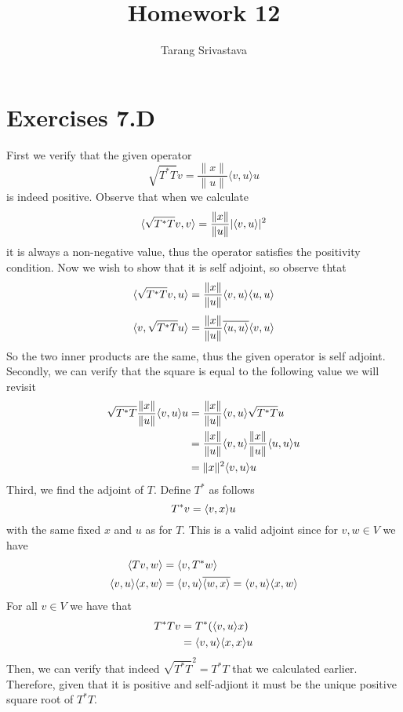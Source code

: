 \documentclass[10pt, twocolumn]{article}
\title{Homework 12}
\author{Tarang Srivastava}
\begin{document}
\makechaptertitle

\section{Exercises 7.D}
\begin{q}[1]
    First we verify that the given operator
    $$ \sqrt{T^{*} T} v=\frac{\|x\|}{\|u\|}\langle v, u\rangle u $$
    is indeed positive. 
    Observe that when we calculate 
    $$ \langle \sqrt{T^{*} T} v, v\rangle = \frac{\|x\|}{\|u\|}|\langle v, u\rangle|^2 $$
    it is always a non-negative value, thus the operator satisfies the positivity condition.
    Now we wish to show that it is self adjoint, so observe thtat 
    $$  \langle \sqrt{T^* T}v, u\rangle = \frac{\|x\|}{\|u\|}\langle v, u\rangle \langle u, u\rangle $$
    $$  \langle v, \sqrt{T^* T}u\rangle = \frac{\|x\|}{\|u\|} \overline{\langle u, u\rangle} \langle v, u\rangle $$
    So the two inner products are the same, thus the given operator is self adjoint.
    Secondly, we can verify that the square is equal to the following value we will revisit
    \begin{align*}
        \sqrt{T^{*} T} \frac{\|x\|}{\|u\|}\langle v, u\rangle u &= \frac{\|x\|}{\|u\|}\langle v, u\rangle \sqrt{T^{*} T} u \\
        &= \frac{\|x\|}{\|u\|}\langle v, u\rangle \frac{\|x\|}{\|u\|}\langle u, u\rangle u \\
        &= \|x\|^2 \langle v, u\rangle u
    \end{align*}
    Third, we find the adjoint of $ T $. 
    Define $ T^* $ as follows
    $$ T^*v = \langle v, x\rangle u $$
    with the same fixed $ x $ and $ u $ as for $ T $.
    This is a valid adjoint since for $ v, w \in V $ we have
    \begin{align*}
        \langle Tv, w\rangle &= \langle v, T^*w\rangle \\
        \langle v, u\rangle\langle x, w\rangle &= \langle v, u\rangle\overline{\langle w, x\rangle} = \langle v, u\rangle\langle x, w\rangle
    \end{align*}
    For all $ v \in V $ we have that 
    \begin{align*}
        T^* T v &= T^*(\langle v, u\rangle x) \\
        &= \langle v, u\rangle \langle x, x\rangle u
    \end{align*}
    Then, we can verify that indeed $ \sqrt{T^* T}^2 = T^*T $ that we calculated earlier.
    Therefore, given that it is positive and self-adjiont it must be the unique positive square root of $ T^*T $.
\end{q}
\end{document}
